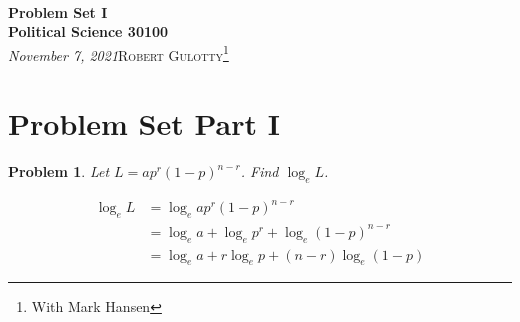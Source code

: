 \documentclass[12pt]{article}
\newtheorem{p}{Problem}[section]
\begin{document}
{\noindent\Huge\bf  \\[0.5\baselineskip] {\selectfont  Problem Set I}         }\\[2\baselineskip] %
{ {\bf {}\selectfont Political Science 30100}\\ {\textit{\selectfont     November 7, 2021}}}\hfill   {\large \textsc{Robert Gulotty}\footnote{With Mark Hansen}} %
\\[1.4\baselineskip] 



\section{Problem Set Part I}
 
\begin{p} Let $L = a p^r (1 - p)^{n-r}$. Find $\log_{e}L$.
\end{p}
\begin{align*}
\log_{e}L&=\log_{e} a p^r (1 - p)^{n-r} \tag{by definition of $L$}\\
&=\log_{e} a +\log_{e} p^r +\log_{e} (1 - p)^{n-r} \tag{$\log(ab)=\log(a)+\log(b)$}\\
&=\log_{e} a +r\log_{e} p +(n-r)\log_{e} (1 - p) \tag{$\log(a^b)=b\log(a)$}
\end{align*}
\end{document}

